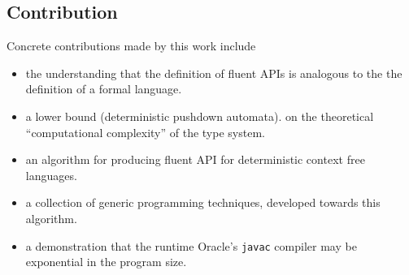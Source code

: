 \subsection{Contribution}
Concrete contributions made by this work include
\begin{itemize}
  \item the understanding that the definition of fluent APIs is analogous to the 
      the definition of a formal language.
  \item a lower bound (deterministic pushdown automata). 
    on the theoretical ``computational complexity'' of the \Java type system.
  \item an algorithm for producing fluent API for deterministic context free languages.
  \item a collection of generic programming techniques, developed towards this algorithm. 
  \item a demonstration that the runtime Oracle's \texttt{javac} compiler may be exponential in the program size. 
\end{itemize}



